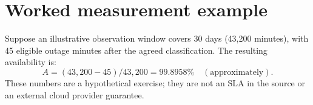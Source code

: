 \documentclass[10pt,letterpaper]{article}
\begin{document}
\section{Worked measurement example}
Suppose an illustrative observation window covers 30 days (43,200 minutes), with 45 eligible outage minutes after the agreed classification. The resulting availability is:
\[
 A=(43{,}200-45)/43{,}200=99.8958\%\quad(\text{approximately}).
\]
These numbers are a hypothetical exercise; they are not an SLA in the source or an external cloud provider guarantee.

\end{document}
